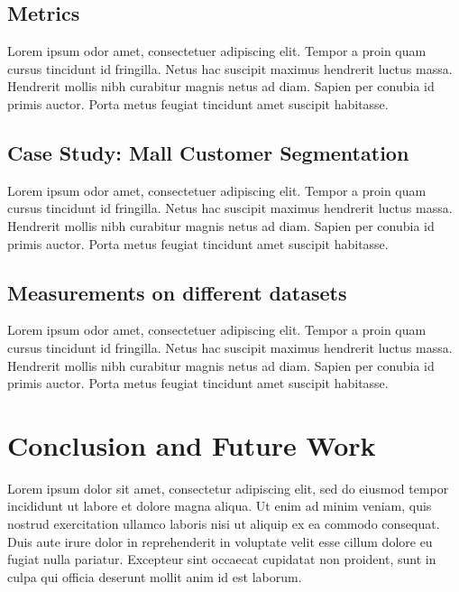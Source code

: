 \documentclass[10pt,twocolumn,letterpaper]{article}
\begin{document}

\subsection{Metrics}

Lorem ipsum odor amet, consectetuer adipiscing elit. Tempor a proin quam cursus
tincidunt id fringilla. Netus hac suscipit maximus hendrerit luctus massa.
Hendrerit mollis nibh curabitur magnis netus ad diam. Sapien per conubia id
primis auctor. Porta metus feugiat tincidunt amet suscipit habitasse.


\subsection{Case Study: Mall Customer Segmentation}

Lorem ipsum odor amet, consectetuer adipiscing elit. Tempor a proin quam cursus
tincidunt id fringilla. Netus hac suscipit maximus hendrerit luctus massa.
Hendrerit mollis nibh curabitur magnis netus ad diam. Sapien per conubia id
primis auctor. Porta metus feugiat tincidunt amet suscipit habitasse.


\subsection{Measurements on different datasets}

Lorem ipsum odor amet, consectetuer adipiscing elit. Tempor a proin quam cursus
tincidunt id fringilla. Netus hac suscipit maximus hendrerit luctus massa.
Hendrerit mollis nibh curabitur magnis netus ad diam. Sapien per conubia id
primis auctor. Porta metus feugiat tincidunt amet suscipit habitasse.


\section{Conclusion and Future Work}\label{sec:conclusion-and-future-work}

Lorem ipsum dolor sit amet, consectetur adipiscing elit, sed do eiusmod tempor
incididunt ut labore et dolore magna aliqua. Ut enim ad minim veniam, quis
nostrud exercitation ullamco laboris nisi ut aliquip ex ea commodo consequat.
Duis aute irure dolor in reprehenderit in voluptate velit esse cillum dolore eu
fugiat nulla pariatur. Excepteur sint occaecat cupidatat non proident, sunt in
culpa qui officia deserunt mollit anim id est laborum.
\end{document}
